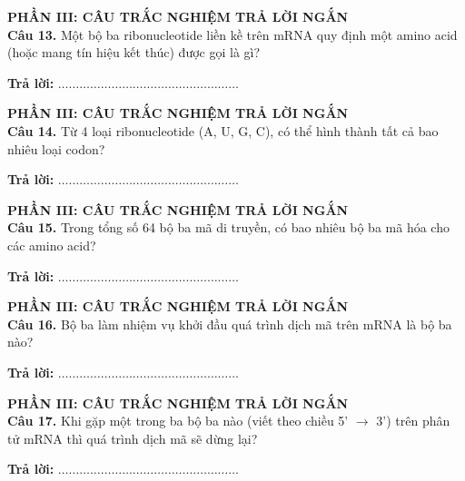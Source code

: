 \documentclass{article}
\begin{document}
\begin{minipage}[t][14.4cm][t]{\linewidth}
\fontsize{28}{38}\selectfont
{\color{brandGreen}\textbf{PHẦN III: CÂU TRẮC NGHIỆM TRẢ LỜI NGẮN}\\[10pt]}
\textbf{Câu 13.} Một bộ ba ribonucleotide liền kề trên mRNA quy định một amino acid (hoặc mang tín hiệu kết thúc) được gọi là gì?
\vspace{20pt}

\textbf{Trả lời:} $\dots\dots\dots\dots\dots\dots\dots\dots\dots\dots\dots\dots\dots\dots\dots\dots\dots$
\vfill
\end{minipage}
\newpage


\begin{minipage}[t][14.4cm][t]{\linewidth}
\fontsize{28}{38}\selectfont
{\color{brandGreen}\textbf{PHẦN III: CÂU TRẮC NGHIỆM TRẢ LỜI NGẮN}\\[10pt]}
\textbf{Câu 14.} Từ 4 loại ribonucleotide (A, U, G, C), có thể hình thành tất cả bao nhiêu loại codon?
\vspace{20pt}

\textbf{Trả lời:} $\dots\dots\dots\dots\dots\dots\dots\dots\dots\dots\dots\dots\dots\dots\dots\dots\dots$
\vfill
\end{minipage}
\newpage


\begin{minipage}[t][14.4cm][t]{\linewidth}
\fontsize{28}{38}\selectfont
{\color{brandGreen}\textbf{PHẦN III: CÂU TRẮC NGHIỆM TRẢ LỜI NGẮN}\\[10pt]}
\textbf{Câu 15.} Trong tổng số 64 bộ ba mã di truyền, có bao nhiêu bộ ba mã hóa cho các amino acid?
\vspace{20pt}

\textbf{Trả lời:} $\dots\dots\dots\dots\dots\dots\dots\dots\dots\dots\dots\dots\dots\dots\dots\dots\dots$
\vfill
\end{minipage}
\newpage


\begin{minipage}[t][14.4cm][t]{\linewidth}
\fontsize{28}{38}\selectfont
{\color{brandGreen}\textbf{PHẦN III: CÂU TRẮC NGHIỆM TRẢ LỜI NGẮN}\\[10pt]}
\textbf{Câu 16.} Bộ ba làm nhiệm vụ khởi đầu quá trình dịch mã trên mRNA là bộ ba nào?
\vspace{20pt}

\textbf{Trả lời:} $\dots\dots\dots\dots\dots\dots\dots\dots\dots\dots\dots\dots\dots\dots\dots\dots\dots$
\vfill
\end{minipage}
\newpage


\begin{minipage}[t][14.4cm][t]{\linewidth}
\fontsize{28}{38}\selectfont
{\color{brandGreen}\textbf{PHẦN III: CÂU TRẮC NGHIỆM TRẢ LỜI NGẮN}\\[10pt]}
\textbf{Câu 17.} Khi gặp một trong ba bộ ba nào (viết theo chiều 5' $\rightarrow$ 3') trên phân tử mRNA thì quá trình dịch mã sẽ dừng lại?
\vspace{20pt}

\textbf{Trả lời:} $\dots\dots\dots\dots\dots\dots\dots\dots\dots\dots\dots\dots\dots\dots\dots\dots\dots$
\vfill
\end{minipage}
\newpage
\end{document}
